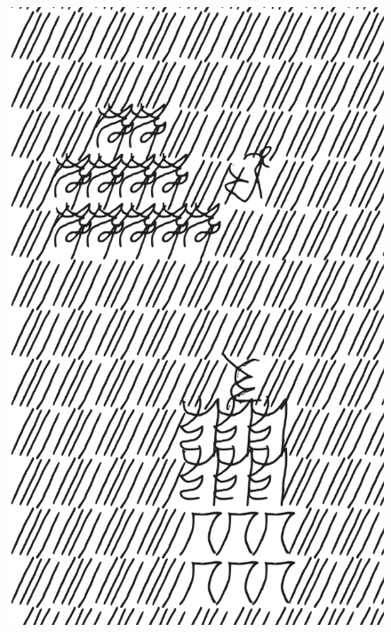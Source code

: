 \makeatletter\@openrightfalse
\movetooddpage
\begin{absolutelynopagebreak}
\begin{vplace}
\begin{figure}[H]
\begin{adjustwidth}{-0.99cm}{}
  \centering
  \vspace*{-1.97cm}
  \hspace*{-0.65cm}
  \includegraphics[width=115mm]{./imgs/img11.pdf}  
  \hfill
\end{adjustwidth}

\thispagestyle{empty}

\end{figure}
\end{vplace}

\end{absolutelynopagebreak}

